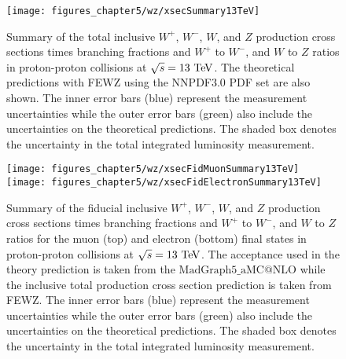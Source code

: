 \begin{figure}[h]
\centering
\texttt{[image: figures\_chapter5/wz/xsecSummary13TeV]}
\caption{Summary of the total inclusive $W^+$, $W^-$, $W$, and $Z$ production cross sections times branching fractions and $W^+$ to $W^-$, and $W$ to $Z$ ratios in proton-proton collisions at $\sqrt{s}=13~\mathrm{Te\kern -0.1em V}$. The theoretical predictions with FEWZ using the NNPDF3.0 PDF set are also shown. The inner error bars (blue) represent the measurement uncertainties while the outer error bars (green) also include the uncertainties on the theoretical predictions. The shaded box denotes the uncertainty in the total integrated luminosity measurement.}
\label{fig:13tev}
\end{figure}
\begin{figure}[h]
\centering
\texttt{[image: figures\_chapter5/wz/xsecFidMuonSummary13TeV]}
\texttt{[image: figures\_chapter5/wz/xsecFidElectronSummary13TeV]}
\caption{Summary of the fiducial inclusive $W^+$, $W^-$, $W$, and $Z$ production cross sections times branching fractions and $W^+$ to $W^-$, and $W$ to $Z$ ratios for the muon (top) and electron (bottom) final states in proton-proton collisions at $\sqrt{s}=13~\mathrm{Te\kern -0.1em V}$. The acceptance used in the theory prediction is taken from the $\mathrm{MadGraph5}\_\mathrm{aMC@NLO}$ while the inclusive total production cross section prediction is taken from FEWZ. The inner error bars (blue) represent the measurement uncertainties while the outer error bars (green) also include the uncertainties on the theoretical predictions. The shaded box denotes the uncertainty in the total integrated luminosity measurement.}
\label{fig:fid}
\end{figure}
